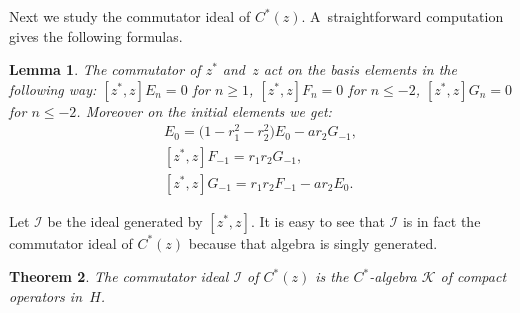 \documentclass[pdftex]{sigma}
\numberwithin{equation}{section}
\newtheorem{Theorem}{Theorem}[section]
\newtheorem{Lemma}[Theorem]{Lemma}
\begin{document}
Next we study the commutator ideal of $C^*(z)$.
A~straightforward computation gives the following formulas.

\begin{Lemma}
\label{commutator_calculation}
The commutator of $z^*$ and~$z$ act on the basis elements in the following way: $[z^*,z]E_n=0$ for $n\ge 1$,
$[z^*,z]F_n=0$ for $n\le -2$, $[z^*,z]G_n =0$ for $n\le -2$.
Moreover on the initial elements we get:
\begin{gather*}
 [z^*,z]E_0=\big(1-r_1^2-r_2^2\big)E_0-ar_2G_{-1},
\\
 [z^*,z]F_{-1} =r_1r_2G_{-1},
\\
 [z^*,z]G_{-1} =r_1r_2F_{-1}-ar_2E_0.
\end{gather*}
\end{Lemma}

Let $\mathcal{I}$ be the ideal generated by $[z^*,z]$.
It is easy to see that $\mathcal{I}$ is in fact the commutator ideal of $C^*(z)$ because that algebra is singly generated.

\begin{Theorem}%
The commutator ideal $\mathcal{I}$ of $C^*(z)$ is the $C^*$-algebra $\mathcal{K}$ of compact operators in~$H$.
\end{Theorem}
\end{document}
